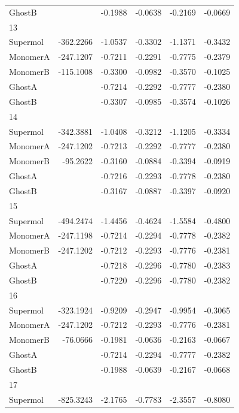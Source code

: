 \documentclass[journal=jctcce,manuscript=article]{achemso}
\begin{document}
\begin{spacing}{1}
\begin{longtable}{lRRRRR}
    GhostB &  & -0.1988 & -0.0638 & -0.2169 & -0.0669 \\
    13 &  &  &  &  &  \\
    Supermol & -362.2266 & -1.0537 & -0.3302 & -1.1371 & -0.3432 \\
    MonomerA & -247.1207 & -0.7211 & -0.2291 & -0.7775 & -0.2379 \\
    MonomerB & -115.1008 & -0.3300 & -0.0982 & -0.3570 & -0.1025 \\
    GhostA &  & -0.7214 & -0.2292 & -0.7777 & -0.2380 \\
    GhostB &  & -0.3307 & -0.0985 & -0.3574 & -0.1026 \\
    14 &  &  &  &  &  \\
    Supermol & -342.3881 & -1.0408 & -0.3212 & -1.1205 & -0.3334 \\
    MonomerA & -247.1202 & -0.7213 & -0.2292 & -0.7777 & -0.2380 \\
    MonomerB & -95.2622 & -0.3160 & -0.0884 & -0.3394 & -0.0919 \\
    GhostA &  & -0.7216 & -0.2293 & -0.7778 & -0.2380 \\
    GhostB &  & -0.3167 & -0.0887 & -0.3397 & -0.0920 \\
    15 &  &  &  &  &  \\
    Supermol & -494.2474 & -1.4456 & -0.4624 & -1.5584 & -0.4800 \\
    MonomerA & -247.1198 & -0.7214 & -0.2294 & -0.7778 & -0.2382 \\
    MonomerB & -247.1202 & -0.7212 & -0.2293 & -0.7776 & -0.2381 \\
    GhostA &  & -0.7218 & -0.2296 & -0.7780 & -0.2383 \\
    GhostB &  & -0.7220 & -0.2296 & -0.7780 & -0.2382 \\
    16 &  &  &  &  &  \\
    Supermol & -323.1924 & -0.9209 & -0.2947 & -0.9954 & -0.3065 \\
    MonomerA & -247.1202 & -0.7212 & -0.2293 & -0.7776 & -0.2381 \\
    MonomerB & -76.0666 & -0.1981 & -0.0636 & -0.2163 & -0.0667 \\
    GhostA &  & -0.7214 & -0.2294 & -0.7777 & -0.2382 \\
    GhostB &  & -0.1988 & -0.0639 & -0.2167 & -0.0668 \\
    17 &  &  &  &  &  \\
    Supermol & -825.3243 & -2.1765 & -0.7783 & -2.3557 & -0.8080 \\

\end{longtable}
\end{spacing}
\end{document}
